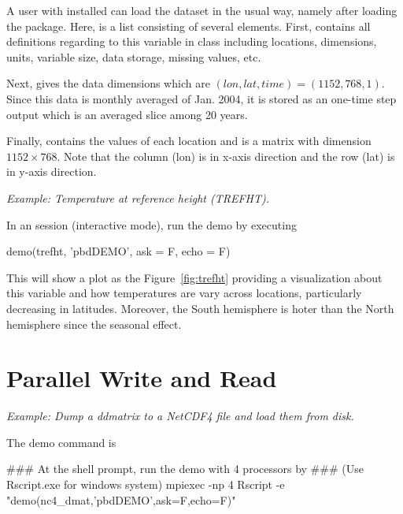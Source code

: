 A user with  installed can load the  dataset in 
the usual way, namely  after loading the  
package.  Here,  is a list consisting of several elements. First, 
 contains all definitions regarding to this variable in
class  including locations, dimensions, 
units, variable size, data storage, missing values, etc. 

Next,  gives the data dimensions which are
$(lon, lat, time) = (1152, 768, 1)$. Since this data is monthly averaged
of Jan. 2004, it is stored as an one-time step output which is
an averaged slice among 20 years.

Finally,  contains the values of each
location and is a matrix with dimension $1152\times 768$. Note that the column 
(lon) is in x-axis direction and the row (lat) is in y-axis direction.


\emph{Example: Temperature at reference height (TREFHT).}

In an  session (interactive mode), run the demo by executing
\begin{Code}[title=R Code]
demo(trefht, 'pbdDEMO', ask = F, echo = F)
\end{Code}
This will show a plot as the Figure~\ref{fig:trefht} providing a
visualization about this variable and how temperatures are vary
across locations, particularly decreasing in latitudes. Moreover, the
South hemisphere is hoter than the North hemisphere since the seasonal
effect.



\section{Parallel Write and Read}

\emph{Example: Dump a ddmatrix to a NetCDF4 file and load them from disk.}

The demo command is
\begin{Command}
### At the shell prompt, run the demo with 4 processors by
### (Use Rscript.exe for windows system)
mpiexec -np 4 Rscript -e "demo(nc4_dmat,'pbdDEMO',ask=F,echo=F)"
\end{Command}

